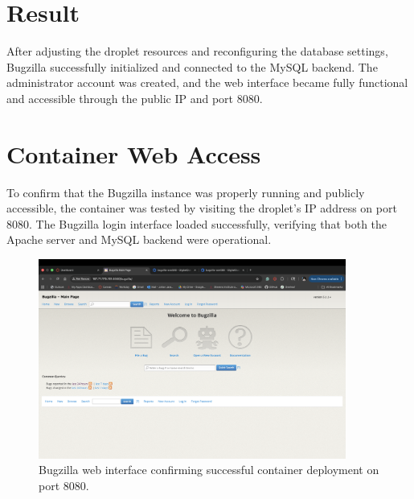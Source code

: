 \section{Result}
After adjusting the droplet resources and reconfiguring the database settings, Bugzilla successfully initialized and connected to the MySQL backend. The administrator account was created, and the web interface became fully functional and accessible through the public IP and port 8080.

\section{Container Web Access}
To confirm that the Bugzilla instance was properly running and publicly accessible, the container was tested by visiting the droplet’s IP address on port 8080. The Bugzilla login interface loaded successfully, verifying that both the Apache server and MySQL backend were operational.

\begin{figure}[H]
    \centering
    \includegraphics[width=0.9\textwidth]{png/bugzilla.png}
    \caption{Bugzilla web interface confirming successful container deployment on port 8080.}
    \label{fig:bugzilla-port}
\end{figure}
